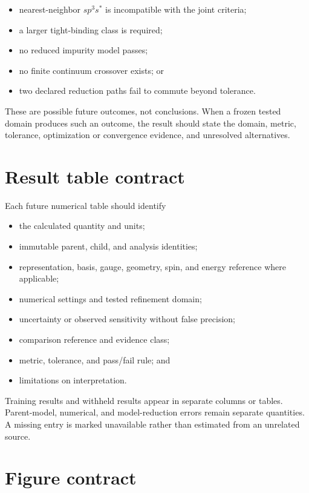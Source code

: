 \begin{itemize}
  \item nearest-neighbor $sp^3s^{\ast}$ is incompatible with the joint criteria;
  \item a larger tight-binding class is required;
  \item no reduced impurity model passes;
  \item no finite continuum crossover exists; or
  \item two declared reduction paths fail to commute beyond tolerance.
\end{itemize}

These are possible future outcomes, not conclusions. When a frozen tested domain
produces such an outcome, the result should state the domain, metric, tolerance,
optimization or convergence evidence, and unresolved alternatives.

\section{Result table contract}

Each future numerical table should identify

\begin{itemize}
  \item the calculated quantity and units;
  \item immutable parent, child, and analysis identities;
  \item representation, basis, gauge, geometry, spin, and energy reference where
    applicable;
  \item numerical settings and tested refinement domain;
  \item uncertainty or observed sensitivity without false precision;
  \item comparison reference and evidence class;
  \item metric, tolerance, and pass/fail rule; and
  \item limitations on interpretation.
\end{itemize}

Training results and withheld results appear in separate columns or tables.
Parent-model, numerical, and model-reduction errors remain separate quantities.
A missing entry is marked unavailable rather than estimated from an unrelated
source.

\section{Figure contract}

